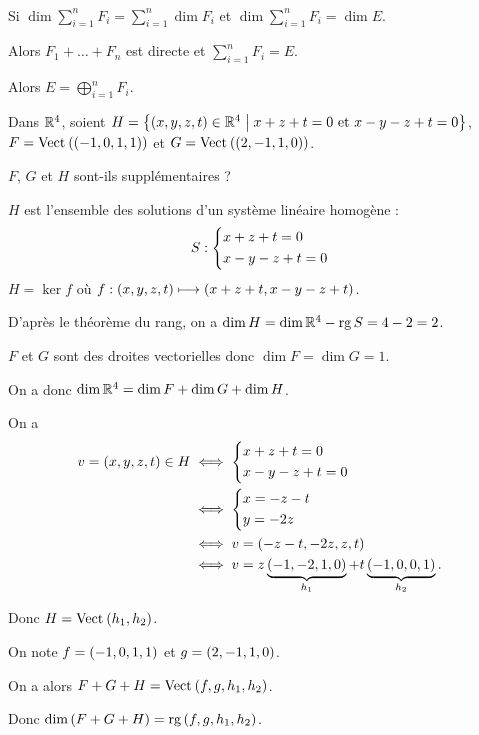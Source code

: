 \begin{dem}~\\
Si \(\dim\sum_{i=1}^nF_i=\sum_{i=1}^n\dim F_i\) et \(\dim\sum_{i=1}^nF_i=\dim E\).

Alors \(F_1+\dots+F_n\) est directe et \(\sum_{i=1}^nF_i=E\).

Alors \(E=\bigoplus_{i=1}^nF_i\).
\end{dem}

\begin{exo}
Dans \(\mathbb{R}^4\), soient \(H=\left\lbrace\left(x,y,z,t\right)\in\mathbb{R}^4\;\middle|\; x+z+t=0\text{ et }x-y-z+t=0\right\rbrace\), \(F=\Vect{\paren{-1,0,1,1}}\) et \(G=\Vect{\paren{2,-1,1,0}}\).

\(F\), \(G\) et \(H\) sont-ils supplémentaires ?
\end{exo}

\begin{corr}
\(H\) est l'ensemble des solutions d'un système linéaire homogène : \[S:\begin{dcases}
x+z+t=0 \\
x-y-z+t=0
\end{dcases}\] \ie \(H=\ker f\) où \(f:\left(x,y,z,t\right)\longmapsto\left(x+z+t,x-y-z+t\right)\).

D'après le théorème du rang, on a \(\dim H=\dim\mathbb{R}^4-\operatorname{rg} S=4-2=2\).

\(F\) et \(G\) sont des droites vectorielles donc \(\dim F=\dim G=1\).

On a donc \(\dim\mathbb{R}^4=\dim F+\dim G+\dim H\).

On a \[\begin{aligned}
v=\left(x,y,z,t\right)\in H&\iff\begin{dcases}
x+z+t=0 \\
x-y-z+t=0
\end{dcases} \\
&\iff\begin{dcases}
x=-z-t \\
y=-2z
\end{dcases} \\
&\iff v=\left(-z-t,-2z,z,t\right) \\
&\iff v=z\underbrace{\left(-1,-2,1,0\right)}_{h_1}+t\underbrace{\left(-1,0,0,1\right)}_{h_2}.
\end{aligned}\]

Donc \(H=\Vect{h_1,h_2}\).

On note \(f=\left(-1,0,1,1\right)\) et \(g=\left(2,-1,1,0\right)\).

On a alors \(F+G+H=\Vect{f,g,h_1,h_2}\).

Donc \(\dim\left(F+G+H\right)=\operatorname{rg}\left(f,g,h_1,h_2\right)\).


\end{corr}
